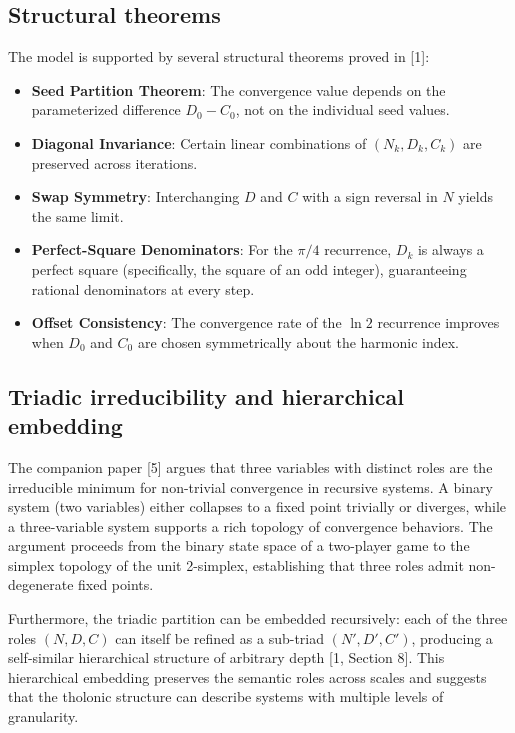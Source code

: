 \documentclass[12pt]{article}
\providecommand{\tightlist}{%
  \setlength{\itemsep}{0pt}\setlength{\parskip}{0pt}}
\begin{document}
\subsection{Structural theorems}\label{structural-theorems}

The model is supported by several structural theorems proved in {[}1{]}:

\begin{itemize}
\tightlist
\item
  \textbf{Seed Partition Theorem}: The convergence value depends on the
  parameterized difference \(D_0 - C_0\), not on the individual seed
  values.
\item
  \textbf{Diagonal Invariance}: Certain linear combinations of
  \((N_k, D_k, C_k)\) are preserved across iterations.
\item
  \textbf{Swap Symmetry}: Interchanging \(D\) and \(C\) with a sign
  reversal in \(N\) yields the same limit.
\item
  \textbf{Perfect-Square Denominators}: For the \(\pi/4\) recurrence,
  \(D_k\) is always a perfect square (specifically, the square of an odd
  integer), guaranteeing rational denominators at every step.
\item
  \textbf{Offset Consistency}: The convergence rate of the \(\ln 2\)
  recurrence improves when \(D_0\) and \(C_0\) are chosen symmetrically
  about the harmonic index.
\end{itemize}

\subsection{Triadic irreducibility and hierarchical embedding}\label{triadic-irreducibility-and-hierarchical-embedding}

The companion paper {[}5{]} argues that three variables with distinct
roles are the irreducible minimum for non-trivial convergence in
recursive systems. A binary system (two variables) either collapses to a
fixed point trivially or diverges, while a three-variable system
supports a rich topology of convergence behaviors. The argument proceeds
from the binary state space of a two-player game to the simplex topology
of the unit 2-simplex, establishing that three roles admit
non-degenerate fixed points.

Furthermore, the triadic partition can be embedded recursively: each of
the three roles \((N, D, C)\) can itself be refined as a sub-triad
\((N', D', C')\), producing a self-similar hierarchical structure of
arbitrary depth {[}1, Section 8{]}. This hierarchical embedding
preserves the semantic roles across scales and suggests that the
tholonic structure can describe systems with multiple levels of
granularity.
\end{document}
